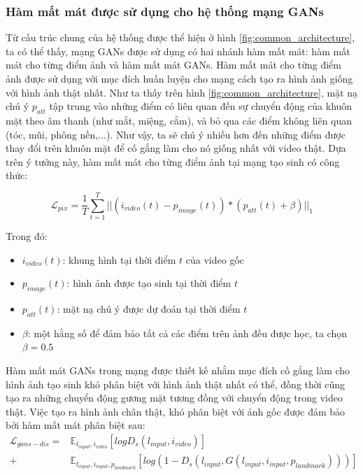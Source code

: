 \subsubsection{Hàm mất mát được sử dụng cho hệ thống mạng GANs}

Từ cấu trúc chung của hệ thống được thể hiện ở hình \ref{fig:common_architecture}, ta có thể thấy, mạng GANs được sử dụng có hai nhánh hàm mất mát: hàm mất mát cho từng điểm ảnh và hàm mất mát GANs. Hàm mất mát cho từng điểm ảnh được sử dụng với mục đích huấn luyện cho mạng cách tạo ra hình ảnh giống với hình ảnh thật nhất. Như ta thấy trên hình \ref{fig:common_architecture}, mặt nạ chú ý $p_{att}$ tập trung vào những điểm có liên quan đến sự chuyển động của khuôn mặt theo âm thanh (như mắt, miệng, cằm), và bỏ qua các điểm không liên quan (tóc, mũi, phông nền,...). Như vậy, ta sẽ chú ý nhiều hơn đến những điểm được thay đổi trên khuôn mặt để cố gắng làm cho nó giống nhất với video thật. Dựa trên ý tưởng này, hàm mất mát cho từng điểm ảnh tại mạng tạo sinh có công thức:

\begin{equation}
    \mathcal{L}_{pix} = \frac{1}{T}\sum^T_{t=1}||(i_{video}(t)-p_{image}(t))*(p_{att}(t)+\beta)||_1
\end{equation}

Trong đó:
\begin{itemize}
    \item \textbf{$i_{video}(t)$}: khung hình tại thời điểm $t$ của video gốc
    \item \textbf{$p_{image}(t)$}: hình ảnh được tạo sinh tại thời điểm $t$
    \item \textbf{$p_{att}(t)$}: mặt nạ chú ý được dự đoán tại thời điểm $t$
    \item \textbf{$\beta$}: một hằng số để đảm bảo tất cả các điểm trên ảnh đều được học, ta chọn $\beta = 0.5$ 
\end{itemize}

Hàm mất mát GANs trong mạng được thiết kế nhằm mục đích cố gắng làm cho hình ảnh tạo sinh khó phân biệt với hình ảnh thật nhất có thể, đồng thời cũng tạo ra những chuyển động gương mặt tương đồng với chuyển động trong video thật. Việc tạo ra hình ảnh chân thật, khó phân biệt với ảnh gốc được đảm bảo bởi hàm mất mát phân biệt sau:
\begin{equation}
    \begin{split}
    \mathcal{L}_{gans-dis} = &\mathbb{E}_{l_{input},i_{video}}[logD_s(l_{input},i_{video})]\\
    +&\mathbb{E}_{l_{input},i_{input},p_{landmark}}[log(1-D_s(l_{input},G(l_{input},i_{input},p_{landmark})))]
    \end{split}
\end{equation}

